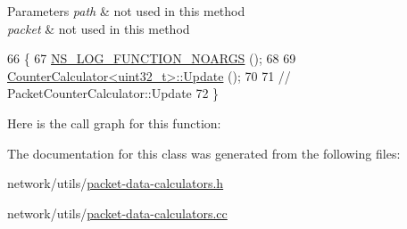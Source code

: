 \begin{DoxyParams}{Parameters}
{\em path} & not used in this method \\
\hline
{\em packet} & not used in this method \\
\hline
\end{DoxyParams}

\begin{DoxyCode}
66 \{
67   \hyperlink{log-macros-disabled_8h_a8f7e4afc291c9d29a65c18ac1f79197b}{NS\_LOG\_FUNCTION\_NOARGS} ();
68 
69   \hyperlink{classns3_1_1CounterCalculator_adfbacf120e83c14e585a4a0ca84b59c9}{CounterCalculator<uint32\_t>::Update} ();
70 
71   \textcolor{comment}{// PacketCounterCalculator::Update}
72 \}
\end{DoxyCode}


Here is the call graph for this function\+:




The documentation for this class was generated from the following files\+:\begin{DoxyCompactItemize}
\item 
network/utils/\hyperlink{packet-data-calculators_8h}{packet-\/data-\/calculators.\+h}\item 
network/utils/\hyperlink{packet-data-calculators_8cc}{packet-\/data-\/calculators.\+cc}\end{DoxyCompactItemize}
